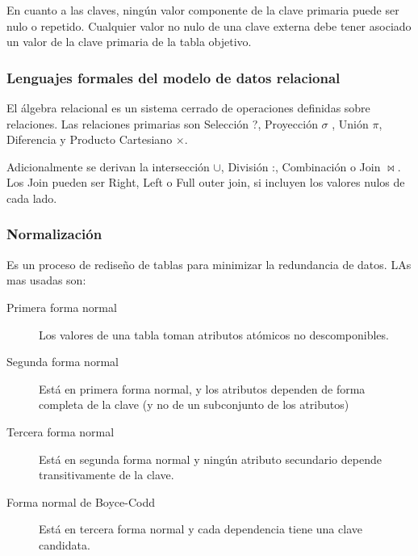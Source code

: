         En cuanto a las claves, ningún valor componente de la clave primaria puede ser nulo o repetido. Cualquier valor no nulo de una clave externa  debe tener asociado un valor de la clave primaria de la tabla objetivo.

    \subsubsection{Lenguajes formales del modelo de datos relacional}
        El álgebra relacional es un sistema cerrado de operaciones definidas sobre relaciones. Las relaciones primarias son Selección ?, Proyección \begin{math}\sigma\end{math}
        , Unión \begin{math}\pi\end{math}, Diferencia y Producto Cartesiano \begin{math}\times\end{math}.

        Adicionalmente se derivan la intersección \begin{math}\cup\end{math}, División :, Combinación o Join \begin{math}\Join\end{math}. Los Join pueden ser Right, Left o Full outer join, si incluyen los valores nulos de cada lado.


    \subsubsection{Normalización}
        Es un proceso de rediseño de tablas para minimizar la redundancia de datos. LAs mas usadas son:
        \begin{description}
            \item[Primera forma normal] Los valores de una tabla toman atributos atómicos no descomponibles.
            \item[Segunda forma normal] Está en primera forma normal, y los atributos dependen de forma completa de la clave (y no de un subconjunto de los atributos)
            \item[Tercera forma normal] Está en segunda forma normal y ningún atributo secundario depende transitivamente de la clave.
            \item[Forma normal de Boyce-Codd] Está en tercera forma normal y cada dependencia tiene una clave candidata.
        \end{description}

